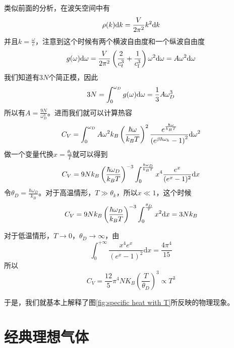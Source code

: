 类似前面的分析，在波矢空间中有\begin{equation}
    \rho(k)\mathrm{d} k =\frac{V}{2\pi^2} k^2 \mathrm{d} k
\end{equation}
并且$k=\frac{\omega}{c}$，注意到这个时候有两个横波自由度和一个纵波自由度\begin{equation}
    g(\omega)\mathrm{d} \omega =\frac{V}{2\pi^2} \left(\frac2{c_t^3}+\frac1{c_l^3}\right)\omega^2 \mathrm{d} \omega=A\omega^2 \mathrm{d} \omega
\end{equation}
我们知道有$3N$个简正模，因此\begin{equation}
    3N =\int_0^{\omega_D} g(\omega)\mathrm{d} \omega =\frac{1}{3}A \omega_D^3
\end{equation}
所以有$\displaystyle A=\frac{9N}{\omega_D^3}$。进而我们就可以计算热容\begin{equation}
    C_V =\int_0^{\omega_D} A\omega^2 k_B \left(\frac{\hbar\omega}{k_BT}\right)^2 \frac{e^{\frac{\hbar\omega}{k_BT}}}{\left(e^{\beta\hbar\omega_k}-1\right)^2}\mathrm{d} \omega^2
\end{equation}
做一个变量代换$\displaystyle x=\frac{\theta_k}{T}$就可以得到\begin{equation}
    C_V =9N k_B  \left(\frac{\hbar\omega_D}{k_BT}\right)^{-3}\int_0^{ \frac{\hbar\omega_D}{k_BT}} x^4 \frac{e^x}{(e^x-1)^2} \mathrm{d} x 
\end{equation}
令$\theta_D =\frac{\hbar\omega_D}{k_B}$。对于高温情形，$T\gg \theta_k$，所以$x\ll 1$，这个时候\begin{equation}
    C_V =9N k_B \left(\frac{\hbar\omega_D}{k_BT}\right)^{-3}\int_0^{ \frac{\theta_D}{T}}x^2 \mathrm{d} x  = 3N k_B 
\end{equation}

对于低温情形，$T\to 0$，$\theta_D\to \infty$，由\begin{equation}
    \int_{0}^{+\infty}\frac{x^4e^x}{(e^x-1)^2} \mathrm{d}x = \frac{4\pi^4}{15}
\end{equation}
所以\begin{equation}
    C_V =\frac{12}{5}\pi^4 N K_B \left(\frac{T}{\theta_D}\right)^3 \propto T^3 \label{equ:C_V in crystal}
\end{equation}

于是，我们就基本上解释了图\ref{fig:specific heat with T}所反映的物理现象。
\section{经典理想气体} %
\label{sec:经典理想气体}
